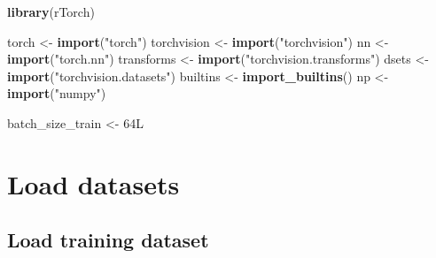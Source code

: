 \documentclass[]{book}
\newenvironment{Shaded}{\begin{snugshade}}{\end{snugshade}}
\newcommand{\CommentTok}[1]{\textcolor[rgb]{0.56,0.35,0.01}{\textit{#1}}}
\newcommand{\DataTypeTok}[1]{\textcolor[rgb]{0.13,0.29,0.53}{#1}}
\newcommand{\KeywordTok}[1]{\textcolor[rgb]{0.13,0.29,0.53}{\textbf{#1}}}
\newcommand{\NormalTok}[1]{#1}
\newcommand{\OperatorTok}[1]{\textcolor[rgb]{0.81,0.36,0.00}{\textbf{#1}}}
\newcommand{\OtherTok}[1]{\textcolor[rgb]{0.56,0.35,0.01}{#1}}
\newcommand{\StringTok}[1]{\textcolor[rgb]{0.31,0.60,0.02}{#1}}
\begin{document}
\begin{Shaded}
\begin{Highlighting}[]
\KeywordTok{library}\NormalTok{(rTorch)}

\NormalTok{torch       <-}\StringTok{ }\KeywordTok{import}\NormalTok{(}\StringTok{"torch"}\NormalTok{)}
\NormalTok{torchvision <-}\StringTok{ }\KeywordTok{import}\NormalTok{(}\StringTok{"torchvision"}\NormalTok{)}
\NormalTok{nn          <-}\StringTok{ }\KeywordTok{import}\NormalTok{(}\StringTok{"torch.nn"}\NormalTok{)}
\NormalTok{transforms  <-}\StringTok{ }\KeywordTok{import}\NormalTok{(}\StringTok{"torchvision.transforms"}\NormalTok{)}
\NormalTok{dsets       <-}\StringTok{ }\KeywordTok{import}\NormalTok{(}\StringTok{"torchvision.datasets"}\NormalTok{)}
\NormalTok{builtins    <-}\StringTok{ }\KeywordTok{import_builtins}\NormalTok{()}
\NormalTok{np          <-}\StringTok{ }\KeywordTok{import}\NormalTok{(}\StringTok{"numpy"}\NormalTok{)}

\NormalTok{batch_size_train <-}\StringTok{  }\NormalTok{64L}
\end{Highlighting}
\end{Shaded}

\hypertarget{load-datasets}{%
\section{Load datasets}\label{load-datasets}}

\hypertarget{load-training-dataset}{%
\subsection{Load training dataset}\label{load-training-dataset}}

\begin{Shaded}
\end{Shaded}
\end{document}
